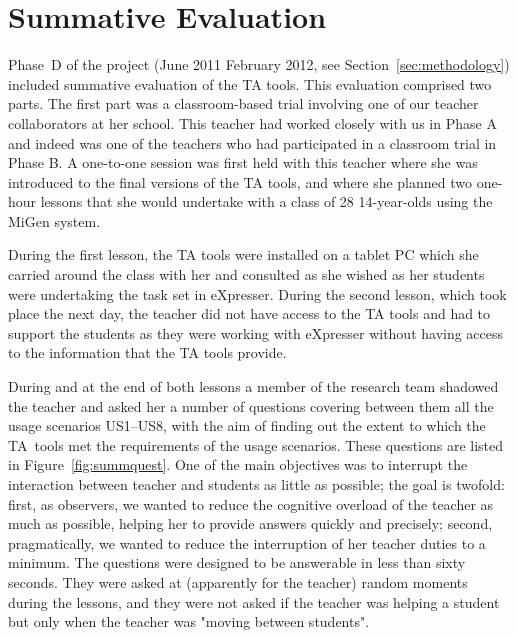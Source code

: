 
\section{Summative Evaluation}
\label{sec:summative-evaluation}

Phase~D of the project (June 2011 February 2012, see
Section~\ref{sec:methodology}) included summative evaluation of the TA
tools. This evaluation comprised two parts. The first part was a
classroom-based trial involving one of our teacher collaborators at
her school. This teacher had worked closely with us in Phase A and
indeed was one of the teachers who had participated in a classroom
trial in Phase B. A one-to-one session was first held with this
teacher where she was introduced to the final versions of the TA
tools, and where she planned two one-hour lessons that she would
undertake with a class of 28 14-year-olds using the MiGen system.

During the first lesson, the TA tools were installed on a tablet PC
which she carried around the class with her and consulted as she
wished as her students were undertaking the task set in
eXpresser. During the second lesson, which took place the next day,
the teacher did not have access to the TA tools and had to support the
students as they were working with eXpresser without having access to
the information that the TA tools provide.

During and at the end of both lessons a member of the research team
shadowed the teacher and asked her a number of questions covering
between them all the usage scenarios US1--US8, with the aim of finding
out the extent to which the TA~tools met the requirements of the usage
scenarios. These questions are listed in
Figure~\ref{fig:summquest}. One of the main
objectives was to interrupt the interaction between teacher and
students as little as possible; the goal is twofold: first, as
observers, we wanted to reduce the cognitive overload of the teacher
as much as possible, helping her to provide answers quickly and
precisely; second, pragmatically, we wanted to reduce the interruption
of her teacher duties to a minimum. The questions were designed to be
answerable in less than sixty seconds. They were asked at (apparently
for the teacher) random moments during the lessons, and they were not
asked if the teacher was helping a student but only when the teacher
was "moving between students".

